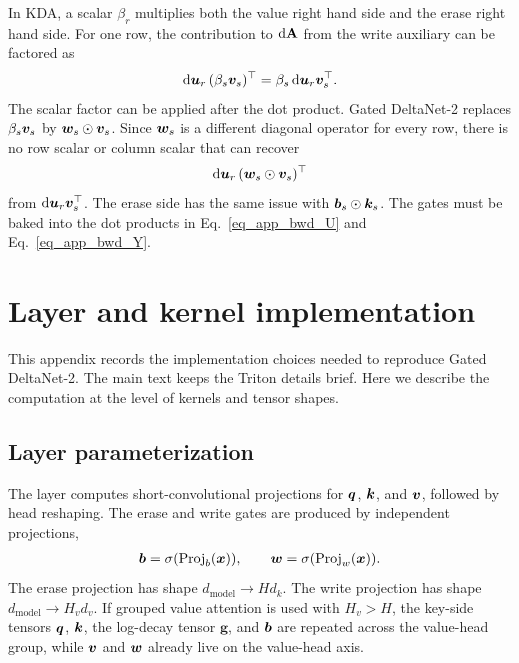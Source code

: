 In KDA, a scalar $\beta_r$ multiplies both the value right hand side and the erase right hand side. For one row, the contribution to $\mathrm{d}{\mathbf{A}}$ from the write auxiliary can be factored as
\begin{align}
    \mathrm{d}{\bm{u}}_r\,(\beta_s{\bm{v}}_s)^\top
    =
    \beta_s\,\mathrm{d}{\bm{u}}_r{\bm{v}}_s^\top .
\label{eq_app_scalar_factor}
\end{align}
The scalar factor can be applied after the dot product. Gated DeltaNet-2 replaces $\beta_s{\bm{v}}_s$ by ${\bm{w}}_s\odot{\bm{v}}_s$. Since ${\bm{w}}_s$ is a different diagonal operator for every row, there is no row scalar or column scalar that can recover
\begin{align}
    \mathrm{d}{\bm{u}}_r\,({\bm{w}}_s\odot{\bm{v}}_s)^\top
\label{eq_app_vector_factor_write}
\end{align}
from $\mathrm{d}{\bm{u}}_r{\bm{v}}_s^\top$. The erase side has the same issue with ${\bm{b}}_s\odot{\bm{k}}_s$. The gates must be baked into the dot products in Eq.~\ref{eq_app_bwd_U} and Eq.~\ref{eq_app_bwd_Y}.

\section{Layer and kernel implementation}
\label{app_implementation}

This appendix records the implementation choices needed to reproduce Gated DeltaNet-2. The main text keeps the Triton details brief. Here we describe the computation at the level of kernels and tensor shapes.

\subsection{Layer parameterization}
\label{app_layer}

The layer computes short-convolutional projections for ${\bm{q}}$, ${\bm{k}}$, and ${\bm{v}}$, followed by head reshaping. The erase and write gates are produced by independent projections,
\begin{align}
    {\bm{b}} = \sigma(\operatorname{Proj}_{b}({\bm{x}})),
    \qquad
    {\bm{w}} = \sigma(\operatorname{Proj}_{w}({\bm{x}})).
\label{eq_app_layer_gates}
\end{align}
The erase projection has shape $d_{\mathrm{model}}\to H d_k$. The write projection has shape $d_{\mathrm{model}}\to H_v d_v$. If grouped value attention is used with $H_v>H$, the key-side tensors ${\bm{q}}$, ${\bm{k}}$, the log-decay tensor $\boldsymbol{g}$, and ${\bm{b}}$ are repeated across the value-head group, while ${\bm{v}}$ and ${\bm{w}}$ already live on the value-head axis.

